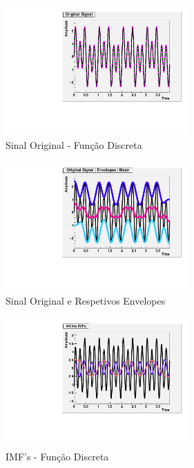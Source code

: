 \documentclass[letterpaper]{article}
\begin{document}
\begin{multicols}{2}



\begin{center}
\begin{figure}[H]
\centering
    \includegraphics[width=7cm]{OriginalSignal_Sen.pdf}
    \caption{Sinal Original - Função Discreta}
\end{figure}
\end{center}

\begin{center}
\begin{figure}[H]
\centering
    \includegraphics[width=7cm]{Signal_mean_Sen.pdf}
    \caption{Sinal Original e Respetivos Envelopes}
\end{figure}
\end{center}

\begin{center}
\begin{figure}[H]
\centering
    \includegraphics[width=7cm]{All_IMFs_Sen.pdf}
    \caption{IMF's - Função Discreta}
\end{figure}
\end{center}


\end{multicols}
\end{document}
